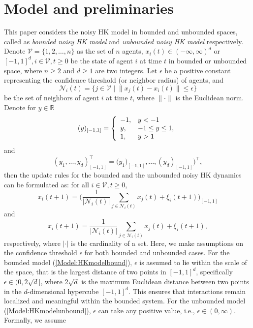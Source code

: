\documentclass[11pt]{article}
\theoremstyle{definition}
\theoremstyle{remark}
\numberwithin{equation}{section}
\begin{document}
\section{Model and preliminaries}\label{Section:high-dim HK}
This paper considers the noisy HK model in bounded and unbounded spaces, called as \emph{bounded noisy HK model} and \emph{unbounded noisy HK model} respectively.
Denote $\mathcal{V}=\{1,2,\ldots,n\}$ as the set of $n$ agents, $x_i(t)\in(-\infty,\infty)^d$ or $[-1,1]^d, i\in\mathcal{V}, t\geq 0$ be the state of agent $i$ at time $t$ in bounded or unbounded space,
where $n\geq 2$ and $d\geq 1$ are two integers. Let
$\epsilon$ be a positive constant representing the confidence threshold (or neighbor radius) of agents, and
\begin{equation}\label{Model:neighbor}
 \mathcal{N}_i(t)=\{j\in\mathcal{V}\; \big|\; \| x_j(t)-x_i(t)\| \leq \epsilon\}
\end{equation}
be the set of neighbors of agent $i$ at time $t$, where $\|\cdot\|$ is the Euclidean norm.
Denote for $y\in \mathbb{R}$
\begin{equation*}
  (y)_{[-1,1]}=\left\{
              \begin{array}{ll}
                -1, & \hbox{$y<-1$} \\
                y, & \hbox{$-1\leq y\leq 1$,} \\
                1, & \hbox{$y>1$}
              \end{array}
            \right.
\end{equation*}
and $$(y_1,...,y_d)^{\top}_{[-1,1]}=\big(y_1)_{[-1,1]},...,(y_d)_{[-1,1]}\big)^{\top},$$
then the update rules for the bounded and the unbounded noisy HK dynamics can be formulated as: for all $ i\in\mathcal{V}, t\geq 0$,
\begin{equation}\label{Model:HKmodelbound}
x_i(t+1)=\bigg(\frac{1}{|\mathcal{N}_i(t)|}\sum\limits_{j\in \mathcal{N}_i(t)}x_j(t)+\xi_i(t+1)\bigg)_{[-1,1]}
\end{equation}
and
\begin{equation}\label{Model:HKmodelunbound}
x_i(t+1)=\frac{1}{|\mathcal{N}_i(t)|}\sum\limits_{j\in \mathcal{N}_i(t)}x_j(t)+\xi_i(t+1),
\end{equation}
respectively,
where $|\cdot|$ is the cardinality of a set. Here, we make assumptions on the confidence threshold $\epsilon$ for both bounded and unbounded cases. For the bounded model (\ref{Model:HKmodelbound}), $\epsilon$ is assumed to lie within the scale of the space, that is the largest distance of two points in $[-1,1]^d$, specifically $\epsilon \in (0, 2\sqrt{d}]$,  where $2\sqrt{d}$ is the maximum Euclidean distance between two points in the $d$-dimensional hypercube $[-1, 1]^d$. This ensures that interactions remain localized and meaningful within the bounded system. For the unbounded model (\ref{Model:HKmodelunbound}), $\epsilon$ can take any positive value, i.e., $\epsilon \in (0, \infty)$.  Formally, we assume
\end{document}
